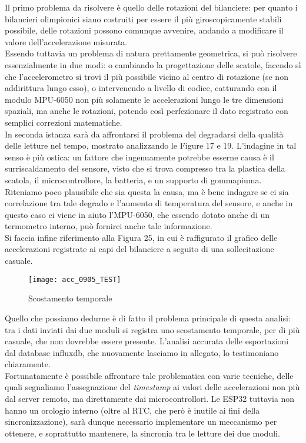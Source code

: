 \documentclass[fleqn,10pt]{SelfArx} %
\begin{document}
Il primo problema da risolvere è quello delle rotazioni del bilanciere: per quanto i bilancieri olimpionici siano costruiti per 
essere il più giroscopicamente stabili possibile, delle rotazioni possono comunque avvenire, andando a modificare il valore 
dell'accelerazione misurata.\\
Essendo tuttavia un problema di natura prettamente geometrica, si può risolvere essenzialmente in due modi: o cambiando la 
progettazione delle scatole, facendo sì che l'accelerometro si trovi il più possibile vicino al centro 
di rotazione (se non addirittura lungo esso), o intervenendo a livello di codice, catturando con il modulo MPU-6050 non più 
solamente le accelerazioni lungo le tre dimensioni spaziali, ma anche le rotazioni, potendo così perfezionare il dato registrato 
con semplici correzioni matematiche.\\

In seconda istanza sarà da affrontarsi il problema del degradarsi della qualità delle letture nel tempo, mostrato analizzando le 
Figure 17 e 19. L'indagine in tal senso è più ostica: un fattore che ingenuamente potrebbe esserne causa è il surriscaldamento del 
sensore, visto che si trova compresso tra la plastica della scatola, il microcontrollore, la batteria, e un supporto di 
gommapiuma. Riteniamo poco plausibile che sia questa la causa, ma è bene indagare se ci sia correlazione tra tale degrado 
e l'aumento di temperatura del sensore, e anche in questo caso ci viene in aiuto l'MPU-6050, che essendo dotato anche di un 
termometro interno, può fornirci anche tale informazione.\\

Si faccia infine riferimento alla Figura 25, in cui è raffigurato il grafico delle accelerazioni registrate ai 
capi del bilanciere a seguito di una sollecitazione casuale.	
\begin{figure}[htb]
	\texttt{[image: acc\_0905\_TEST]}
	\caption{Scostamento temporale}
	\label{fig:scostamento temporale}
\end{figure}

Quello che possiamo dedurne è di fatto il problema principale di questa analisi: 
tra i dati inviati dai due moduli si registra uno scostamento temporale, per di più casuale, che non dovrebbe essere presente. 
L'analisi accurata delle esportazioni dal database influxdb, che nuovamente lasciamo in allegato, lo testimoniano chiaramente.\\
Fortunatamente è possibile affrontare tale problematica con varie tecniche, delle quali segnaliamo l'assegnazione del 
\textit{timestamp} ai valori delle accelerazioni non più dal server remoto, ma direttamente dai microcontrollori. 
Le ESP32 tuttavia non hanno un orologio interno (oltre al RTC, che però è inutile ai fini della sincronizzazione), sarà dunque 
necessario implementare un meccanismo per ottenere, e soprattutto mantenere, la sincronia tra le letture dei due moduli.
\end{document}
